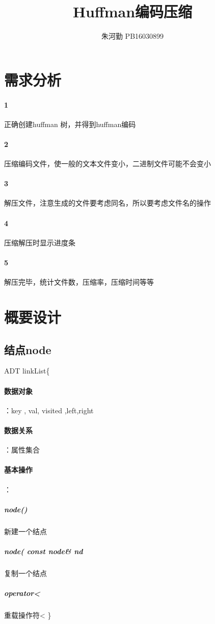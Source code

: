 \documentclass[UTF8]{ctexart}
\title{Huffman编码压缩}
\author{朱河勤   PB16030899}
\begin{document}
\maketitle

\tableofcontents
\section{需求分析}


\paragraph{1}
正确创建huffman 树，并得到huffman编码
\paragraph{2}
压缩编码文件，使一般的文本文件变小，二进制文件可能不会变小
\paragraph{3}
解压文件，注意生成的文件要考虑同名，所以要考虑文件名的操作
\paragraph{4}
压缩解压时显示进度条
\paragraph{5}
解压完毕，统计文件数，压缩率，压缩时间等等


\section{概要设计}
\subsection{结点node}
ADT linkList\{\\
\paragraph{数据对象}：key , val, visited ,left,right \\
\paragraph{数据关系}：属性集合\\
\paragraph{基本操作}：
\subparagraph{node()} 新建一个结点
\subparagraph{node( const node\& nd} 复制一个结点
\subparagraph{operator<}重载操作符<
\}
\end{document}

